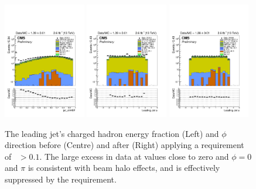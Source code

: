 \begin{figure}
\begin{center}
\includegraphics[width=0.32\textwidth]{figs/analysis/jet_chHEF_mono_all_before.pdf}
\includegraphics[width=0.32\textwidth]{figs/analysis/jet_phi[0]_mono_all_before.pdf}
\includegraphics[width=0.32\textwidth]{figs/analysis/jet_phi[0]_mono_all_after.pdf}
\caption{The leading jet's charged hadron energy fraction (Left) and $\phi$ 
direction before (Centre) and after (Right) applying a requirement of 
\chf~$>0.1$. The large excess in data at \chf values close to zero and $\phi = 
0$ and $\pi$ is consistent with beam halo effects, and is effectively 
suppressed by the \chf requirement.}
\label{fig:beamhalo}
\end{center}
\end{figure}

